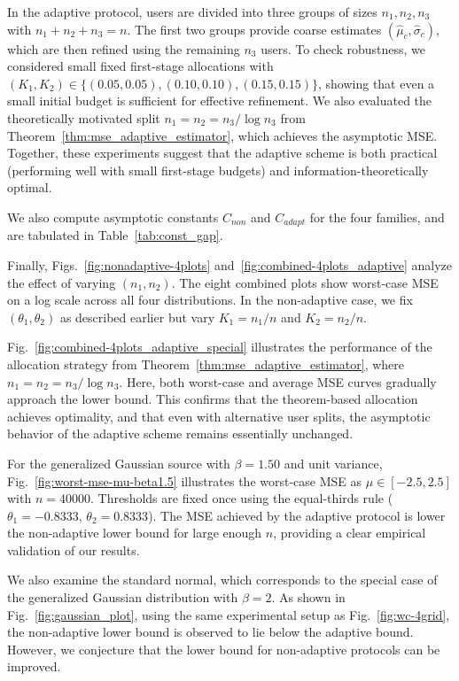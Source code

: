 \documentclass[10pt]{article} %
\theoremstyle{plain}
\theoremstyle{definition}
\theoremstyle{remark}
\begin{document}
In the adaptive protocol, users are divided into three groups of sizes $n_1, n_2, n_3$ with $n_1+n_2+n_3=n$. 
The first two groups provide coarse estimates $(\hat{\mu}_c,\hat{\sigma}_c)$, which are then refined using the remaining $n_3$ users. 
To check robustness, we considered small fixed first-stage allocations with $(K_1,K_2) \in \{(0.05,0.05), (0.10,0.10), (0.15,0.15)\}$, showing that even a small initial budget is sufficient for effective refinement. 
We also evaluated the theoretically motivated split $n_1=n_2=n_3/\log n_3$ from Theorem~\ref{thm:mse_adaptive_estimator}, which achieves the asymptotic MSE. 
Together, these experiments suggest that the adaptive scheme is both practical (performing well with small first-stage budgets) and information-theoretically optimal.

We also compute asymptotic constants $C_{non}$ and $C_{adapt}$ for the four families, and are tabulated in Table~\ref{tab:const_gap}.

Finally, Figs.~\ref{fig:nonadaptive-4plots} and~\ref{fig:combined-4plots_adaptive} analyze the effect of varying $(n_1,n_2)$. The eight combined plots show  worst-case  MSE on a log scale across all four distributions. In the non-adaptive case, we fix $(\theta_1,\theta_2)$ as described earlier but vary $K_1=n_1/n$ and $K_2=n_2/n$. 



Fig.~\ref{fig:combined-4plots_adaptive_special} illustrates the performance of the allocation strategy from Theorem~\ref{thm:mse_adaptive_estimator}, where $n_1=n_2=n_3/\log n_3$. Here, both worst-case and average MSE curves gradually approach the lower bound. This confirms that the theorem-based allocation achieves optimality, and that even with alternative user splits, the asymptotic behavior of the adaptive scheme remains essentially unchanged.

\par For the generalized Gaussian source with $\beta=1.50$ and unit variance, Fig.~\ref{fig:worst-mse-mu-beta1.5} illustrates  the worst-case  MSE as $\mu \in [-2.5,2.5]$ with $n=40000$. Thresholds are fixed once using the equal-thirds rule ($\theta_1=-0.8333$, $\theta_2=0.8333$).  The MSE achieved by the adaptive protocol is lower the non-adaptive lower bound  for large enough $n$, providing a clear empirical validation of our results.

We also examine the standard normal, which corresponds to the special case of the generalized Gaussian distribution with $\beta = 2$. As shown in Fig.~\ref{fig:gaussian_plot}, using the same experimental setup as Fig.~\ref{fig:wc-4grid}, the non-adaptive lower bound is observed to lie below the adaptive bound. However, we conjecture that the lower bound for non-adaptive protocols can be improved.
\end{document}
